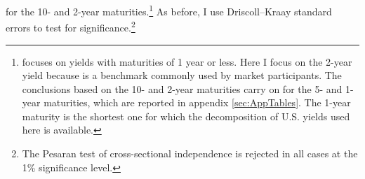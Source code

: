 {for the 10- and 2-year maturities.\footnote{ \cite{Kalemli-Ozcan:2019} focuses on yields with maturities of 1 year or less. Here I focus on the 2-year yield because is a benchmark commonly used by market participants. The conclusions based on the 10- and 2-year maturities carry on for the 5- and 1-year maturities, which are reported in appendix \ref{sec:AppTables}. The 1-year maturity is the shortest one for which the decomposition of U.S. yields used here is available.}
As before, I use Driscoll--Kraay standard errors to test for significance.\footnote{ The Pesaran test of cross-sectional independence is rejected in all cases at the 1\% significance level.} %


}
